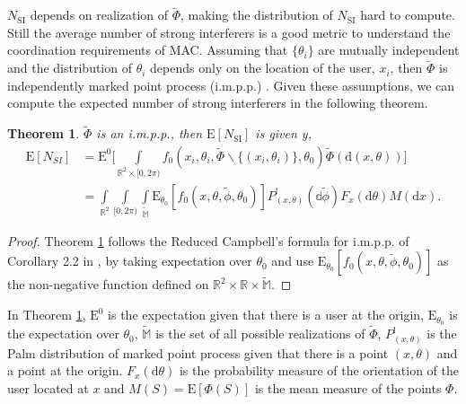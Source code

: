 \documentclass[10pt, conference, letterpaper]{IEEEtran}
\newtheorem{theorem}{Theorem}
\begin{document}
$N_{\mathrm{SI}}$ depends on realization of $\tilde{\Phi}$, making the distribution of $N_{\mathrm{SI}}$ hard to compute. Still the average number of strong interferers is a good metric to understand the coordination requirements of MAC. Assuming that $\{\theta_i\}$ are mutually independent and the distribution of $\theta_i$ depends only on the location of the user, $x_i$, then $\tilde{\Phi}$ is independently marked point process (i.m.p.p.) \cite{stochasticgeometry}. Given these assumptions, we can compute the expected number of strong interferers in the following theorem.
\begin{theorem}\label{theorem:E_N_SI}
	$\tilde{\Phi}$ is an i.m.p.p., then $\mathrm{E}[N_{\mathrm{SI}}]$ is given y,
	\begin{equation} \label{eq:N_SI}
	\begin{split}
	\mathrm{E}[N_{SI}] &= \mathrm{E}^0\bigg[\int\limits_{\mathbb{R}^2\times[0,2\pi)}f_0(x_i, \theta_i, \tilde{\Phi}\backslash\{(x_i,\theta_i)\}, \theta_0)\tilde{\Phi}(\mathrm{d}(x,\theta)) \bigg]\\
	&= \int\limits_{\mathbb{R}^2}\int\limits_{[0,2\pi)}\int\limits_{\mathbb{\tilde{M}}}\mathrm{E}_{\theta_0}[f_0(x,\theta,\tilde{\phi}, \theta_0)]P_{(x,\theta)}^{!}(\mathbb{d}\tilde{\phi})F_x(\mathrm{d}\theta)M(\mathrm{d}x).
	\end{split}
	\end{equation}	
\end{theorem}
\begin{proof}
	Theorem \ref{theorem:E_N_SI} follows the Reduced Campbell's formula for i.m.p.p. of Corollary 2.2 in \cite{stochasticgeometry}, by taking expectation over $\theta_0$ and use $\mathrm{E}_{\theta_0}[f_0(x,\theta,\tilde{\phi}, \theta_0)]$ as the non-negative function defined on $\mathbb{R}^2\times \mathbb{R}\times \mathbb{\tilde{M}}$.
\end{proof}

In Theorem \ref{theorem:E_N_SI}, $\mathrm{E}^0$ is the expectation given that there is a user at the origin, $\mathrm{E}_{\theta_0}$ is the expectation over $\theta_0$, $\mathbb{\tilde{M}}$ is the set of all possible realizations of $\tilde{\Phi}$, $P_{(x,\theta)}^!$ is the Palm distribution of marked point process given that there is a point $(x, \theta)$ and a point at the origin. $F_x(\mathrm{d}\theta)$ is the probability measure of the orientation of the user located at $x$ and $M(S)=\mathrm{E}[\Phi(S)]$ is the mean measure of the points $\Phi$.
\end{document}

